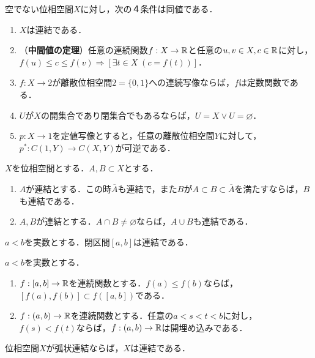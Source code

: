 \documentclass[uplatex, 12pt, dvipdfmx]{jsreport}
\begin{document}
\begin{proposition}\label{prop-charactorization-of-connectedness}
    空でない位相空間$X$に対し，次の４条件は同値である．
    \begin{enumerate}
        \item $X$は連結である．
        \item （\textbf{中間値の定理}）任意の連続関数$f:X\to\mathbb{R}$と任意の$u,v\in X, c\in\mathbb{R}$に対し，$f(u)\le c\le f(v)\Rightarrow[\exists t\in X\;(c=f(t))]$．
        \item $f:X\to 2$が離散位相空間$2=\{0,1\}$への連続写像ならば，$f$は定数関数である．
        \item $U$が$X$の開集合であり閉集合でもあるならば，$U=X\lor U=\varnothing$．
        \item $p:X\to 1$を定値写像とすると，任意の離散位相空間$Y$に対して，$p^*:C(1,Y)\to C(X,Y)$が可逆である．
    \end{enumerate}
\end{proposition}

\begin{corollary}[連結性の伝播]
    $X$を位相空間とする．$A,B\subset X$とする．
    \begin{enumerate}
        \item $A$が連結とする．この時$\overline{A}$も連結で，また$B$が$A\subset B\subset\overline{A}$を満たすならば，$B$も連結である．
        \item $A,B$が連結とする．$A\cap B\ne\varnothing$ならば，$A\cup B$も連結である．
    \end{enumerate}
\end{corollary}

\begin{proposition}
    $a<b$を実数とする．閉区間$[a,b]$は連結である．
\end{proposition}

\begin{corollary}
    $a<b$を実数とする．
    \begin{enumerate}
        \item $f:[a,b]\to\mathbb{R}$を連続関数とする．$f(a)\le f(b)$ならば，$[f(a),f(b)]\subset f([a,b])$である．
        \item $f:(a,b)\to\mathbb{R}$を連続関数とする．任意の$a<s<t<b$に対し，$f(s)<f(t)$ならば，$f:(a,b)\to\mathbb{R}$は開埋め込みである．
    \end{enumerate}
\end{corollary}

\begin{corollary}
    位相空間$X$が弧状連結ならば，$X$は連結である．
\end{corollary}
\end{document}
